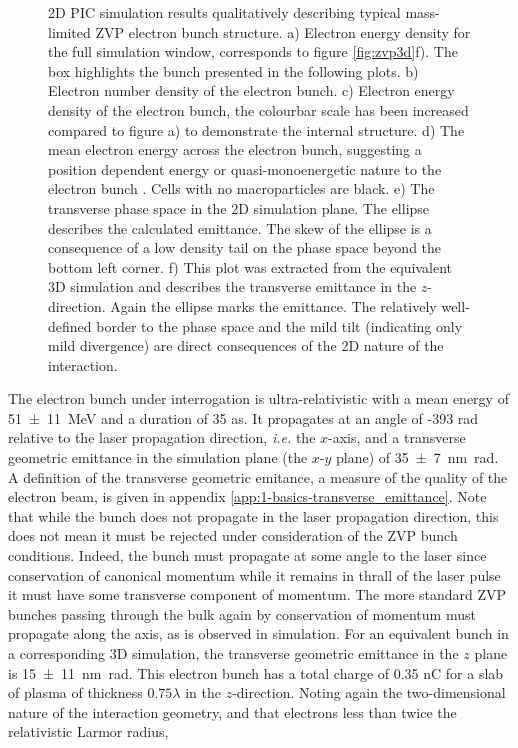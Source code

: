 \begin{figure}
	\caption[2D PIC simulation results qualitatively describing typical mass-limited ZVP electron bunch structure.]{2D PIC simulation results qualitatively describing typical mass-limited ZVP electron bunch structure. a) Electron energy density for the full simulation window, corresponds to figure \ref{fig:zvp3d}f).  The box highlights the bunch presented in the following plots. b) Electron number density of the electron bunch. c) Electron energy density of the electron bunch, the colourbar scale has been increased compared to figure a) to demonstrate the internal structure. d) The mean electron energy across the electron bunch, suggesting a position dependent energy or quasi-monoenergetic nature to the electron bunch \cite{baevaZeroVectorPotential2011}. Cells with no macroparticles are black. e) The transverse phase space in the 2D simulation plane. The ellipse describes the calculated emittance. The skew of the ellipse is a consequence of a low density tail on the phase space beyond the bottom left corner. f) This plot was extracted from the equivalent 3D simulation and describes the transverse emittance in the $z$-direction. Again the ellipse marks the emittance. The relatively well-defined border to the phase space and the mild tilt (indicating only mild divergence) are direct consequences of the 2D nature of the interaction.}
	\label{fig:zvptypicalbunch}
\end{figure}
The electron bunch under interrogation is ultra-relativistic with a mean energy of \qty{51\pm 11}{MeV} and a duration of 35 as. It propagates at an angle of -393 rad relative to the laser propagation direction, \textit{i.e.} the $x$-axis, and a transverse geometric emittance in the simulation plane (the $x$-$y$ plane) of \qty{35 \pm 7}{nm.rad}. A definition of the transverse geometric emitance, a measure of the quality of the electron beam, is given in appendix \ref{app:1-basics-transverse_emittance}. Note that while the bunch does not propagate in the laser propagation direction, this does not mean it must be rejected under consideration of the ZVP bunch conditions. Indeed, the bunch must propagate at some angle to the laser since conservation of canonical momentum while it remains in thrall of the laser pulse it must have some transverse component of momentum. The more standard ZVP bunches passing through the bulk again by conservation of momentum must propagate along the axis, as is observed in simulation. For an equivalent bunch in a corresponding 3D simulation, the transverse geometric emittance in the $z$ plane is \qty{15\pm 11}{nm.rad}. This electron bunch has a total charge of 0.35 nC for a slab of plasma of thickness $0.75\lambda$ in the $z$-direction. Noting again the two-dimensional nature of the interaction geometry, and that electrons less than twice the relativistic Larmor radius, 
